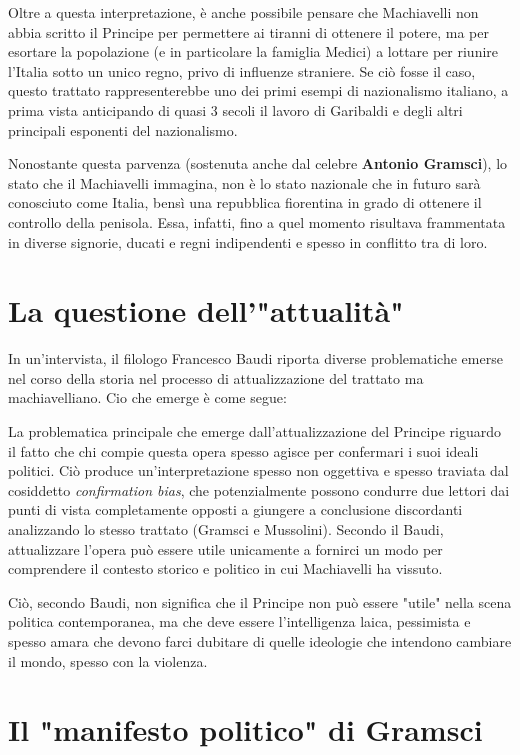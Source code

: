 \documentclass[10pt,a4paper]{report}
\begin{document}
	Oltre a questa interpretazione, è anche possibile pensare che Machiavelli non abbia scritto il Principe per permettere ai tiranni di ottenere il potere, ma per esortare la popolazione (e in particolare la famiglia Medici) a lottare per riunire l'Italia sotto un unico regno, privo di influenze straniere. Se ciò fosse il caso, questo trattato rappresenterebbe uno dei primi esempi di nazionalismo italiano, a prima vista anticipando di quasi 3 secoli il lavoro di Garibaldi e degli altri principali esponenti del nazionalismo. 
	
	Nonostante questa parvenza (sostenuta anche dal celebre \textbf{Antonio Gramsci}), lo stato che il Machiavelli immagina, non è lo stato nazionale che in futuro sarà conosciuto come Italia, bensì una repubblica fiorentina in grado di ottenere il controllo della penisola. Essa, infatti, fino a quel momento risultava frammentata in diverse signorie, ducati e regni indipendenti e spesso in conflitto tra di loro.
	
	\section*{La questione dell'"attualità"}
	
	In un'intervista, il filologo Francesco Baudi riporta diverse problematiche emerse nel corso della storia nel processo di attualizzazione del trattato ma machiavelliano. Cio che emerge è come segue:
	
	La problematica principale che emerge dall'attualizzazione del Principe riguardo il fatto che chi compie questa opera spesso agisce per confermari i suoi ideali politici. Ciò produce un'interpretazione spesso non oggettiva e spesso traviata dal cosiddetto \textit{confirmation bias}, che potenzialmente possono condurre due lettori dai punti di vista completamente opposti a giungere a conclusione discordanti analizzando lo stesso trattato (Gramsci e Mussolini). Secondo il Baudi, attualizzare l'opera può essere utile unicamente a fornirci un modo per comprendere il contesto storico e politico in cui Machiavelli ha vissuto.
	
	Ciò, secondo Baudi, non significa che il Principe non può essere "utile" nella scena politica contemporanea, ma che deve essere l'intelligenza laica, pessimista e spesso amara che devono farci dubitare di quelle ideologie che intendono cambiare il mondo, spesso con la violenza.
	
	\section*{Il "manifesto politico" di Gramsci}
	
\end{document}
